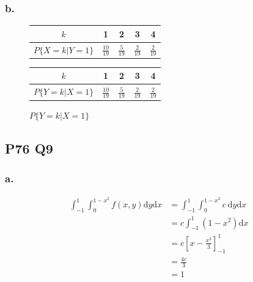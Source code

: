 \documentclass[a4paper,12pt]{ctexart}
\begin{document}
\subsubsection*{b.}

\begin{figure}[H]
	\begin{minipage}{0.5\textwidth}
		\centering
		\begin{tabular}{c|cccc}
			$k$ & 1 & 2 & 3 & 4 \\
			\hline
			$P\{X = k | Y = 1\}$ & $\frac{10}{19}$ & $\frac{5}{19}$ & $\frac{2}{19}$ & $\frac{2}{19}$ \\
		\end{tabular}
		\caption*{$P\{X = k | Y = 1\}$}
	\end{minipage}
	\begin{minipage}{0.5\textwidth}
		\centering
		\begin{tabular}{c|cccc}
			$k$ & 1 & 2 & 3 & 4 \\
			\hline
			$P\{Y = k | X = 1\}$ & $\frac{10}{19}$ & $\frac{5}{19}$ & $\frac{2}{19}$ & $\frac{2}{19}$ \\
		\end{tabular}
		\caption*{$P\{Y = k | X = 1\}$}
	\end{minipage}
\end{figure}

\subsection*{P76 Q9}

\subsubsection*{a.}

\begin{align*}
	\int_{-1}^{1} \int_{0}^{1-x^2} f(x,y) \mathrm{d}y \mathrm{d}x &= \int_{-1}^{1} \int_{0}^{1-x^2} c\ \mathrm{d}y \mathrm{d}x \\
	&= c \int_{-1}^{1} (1-x^2) \mathrm{d}x \\
	&= c \left[x - \frac{x^3}{3}\right]_{-1}^{1} \\
	&= \frac{4c}{3} \\
	&= 1
\end{align*}
\end{document}

